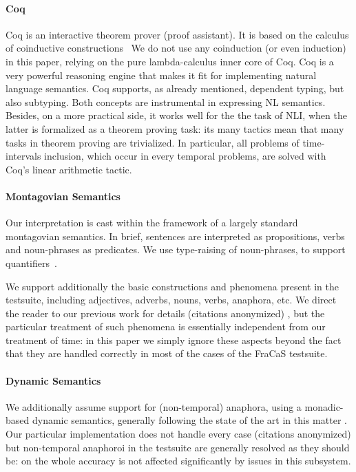 \documentclass[a4paper,11pt]{article}
\begin{document}
\paragraph{Coq}
Coq is an interactive theorem prover (proof assistant). It is based on
the calculus of coinductive constructions~\citep{werner_une_1994} We
do not use any coinduction (or even induction) in this paper, relying
on the pure lambda-calculus inner core of Coq.  Coq is a very powerful
reasoning engine that makes it fit for implementing natural language
semantics.  Coq supports, as already mentioned, dependent typing, but
also subtyping. Both concepts are instrumental in expressing NL
semantics\citet{TODO: chatzikyriakidis and luo}.  Besides, on a more
practical side, it works well for the the task of NLI, when the latter
is formalized as a theorem proving task: its many tactics mean that
many tasks in theorem proving are trivialized. In particular, all
problems of time-intervals inclusion, which occur in every temporal
problems, are solved with Coq's linear arithmetic tactic.

\paragraph{Montagovian Semantics}

Our interpretation is cast within the framework of a largely standard
montagovian semantics. In brief, sentences are interpreted as
propositions, verbs and noun-phrases as predicates.  We use
type-raising of noun-phrases, to support quantifiers~\citep{montague_proper_1974}.

We support additionally the basic constructions and phenomena present
in the testsuite, including adjectives, adverbs, nouns, verbs,
anaphora, etc. We direct the reader to our previous work for details
\ifanon (citations anonymized) \else
\citet{bernardy_type-theoretical_2017} \fi, but the particular
treatment of such phenomena is essentially independent from our
treatment of time:
in this paper we simply ignore these aspects beyond the fact that they
are handled correctly in most of the cases of the FraCaS testsuite.

\paragraph{Dynamic Semantics}
We additionally assume support for (non-temporal) anaphora, using a
monadic-based dynamic semantics, generally following the state of the
art in this matter
\citep{unger_dynamic_2011,charlow_monadic_2015,charlow_modular_2017}.
Our particular implementation does not handle every case \ifanon
(citations anonymized) \else \citet{bernardy_wide-coverage_2019} \fi
but non-temporal anaphoroi in the testsuite are generally resolved as
they should be: on the whole accuracy is not affected significantly by
issues in this subsystem.
\end{document}
